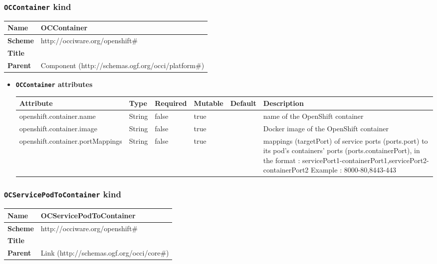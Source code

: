 \subsubsection{\texttt{OCContainer} kind}
\begin{center}
\begin{tabular}{|l|l|}
  \hline
  \textbf{Name} & OCContainer \\
  \hline  
  \textbf{Scheme} & http://occiware.org/openshift\# \\
  \hline
  \textbf{Title} &  \\
  \hline
  \textbf{Parent} & Component (http://schemas.ogf.org/occi/platform\#) \\
  \hline
\end{tabular}
\end{center}
\begin{itemize}
\item \textbf{\texttt{OCContainer} attributes}

\begin{tabularx}{\textwidth}{|l|l|p{1.4cm}|p{1.3cm}|l|X|}
  \hline
  \textbf{Attribute} & \textbf{Type} & \textbf{Required} & \textbf{Mutable} & \textbf{Default} & \textbf{Description} \\
  \hline  
  openshift.container.name & String & false & true &  & name of the OpenShift container \\
  \hline
  openshift.container.image & String & false & true &  & Docker image of the OpenShift container \\
  \hline
  openshift.container.portMappings & String & false & true &  & mappings (targetPort) of service ports (ports.port) to its pod's containers' ports (ports.containerPort), in the format :
servicePort1-containerPort1,servicePort2-containerPort2
Example : 8000-80,8443-443 \\
  \hline
\end{tabularx}
\end{itemize}



\subsubsection{\texttt{OCServicePodToContainer} kind}
\begin{center}
\begin{tabular}{|l|l|}
  \hline
  \textbf{Name} & OCServicePodToContainer \\
  \hline  
  \textbf{Scheme} & http://occiware.org/openshift\# \\
  \hline
  \textbf{Title} &  \\
  \hline
  \textbf{Parent} & Link (http://schemas.ogf.org/occi/core\#) \\
  \hline
\end{tabular}
\end{center}



